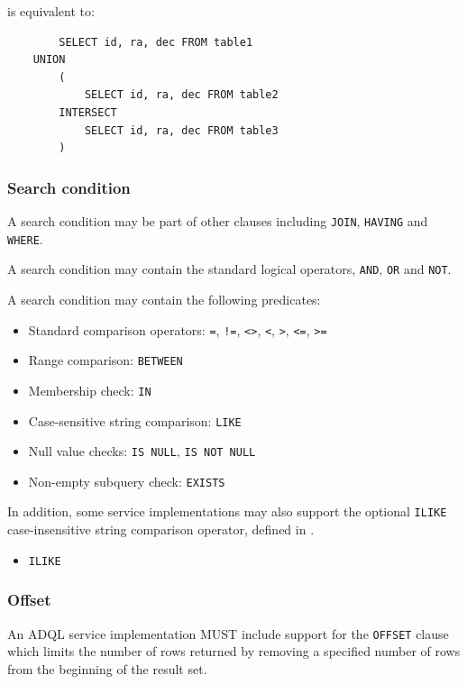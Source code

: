 \documentclass[11pt,a4paper]{ivoa}
\begin{document}
is equivalent to:

\begin{verbatim}
        SELECT id, ra, dec FROM table1
    UNION
        (
            SELECT id, ra, dec FROM table2
        INTERSECT
            SELECT id, ra, dec FROM table3
        )
\end{verbatim}

\subsubsection{Search condition}
\label{sec:search}

A search condition may be part of other clauses including \verb:JOIN:, \verb:HAVING: and \verb:WHERE:.

A search condition may contain the standard logical operators, \verb:AND:, \verb:OR: and \verb:NOT:.

A search condition may contain the following predicates:

\begin{itemize}
    \item Standard comparison operators: \verb:=:, \verb:!=:, \verb:<>:, \verb:<:, \verb:>:, \verb:<=:, \verb:>=:
    \item Range comparison: \verb:BETWEEN:
    \item Membership check: \verb:IN:
    \item Case-sensitive string comparison: \verb:LIKE:
    \item Null value checks: \verb:IS NULL:, \verb:IS NOT NULL:
    \item Non-empty subquery check: \verb:EXISTS:
\end{itemize}

In addition, some service implementations may also support the optional
\verb:ILIKE: case-insensitive string comparison operator, defined in
.

\begin{itemize}
    \item \verb:ILIKE:
\end{itemize}

\subsubsection{Offset}
\label{sec:offset}

An ADQL service implementation MUST include support for the \texttt{OFFSET}
clause which limits the number of rows returned by removing a specified number
of rows from the beginning of the result set.
\end{document}
